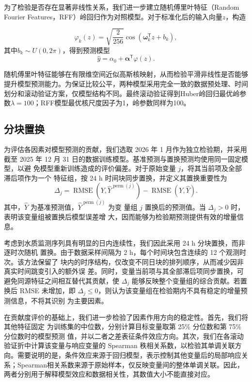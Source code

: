 \documentclass[UTF8,12pt,a4paper]{ctexart}
\begin{document}
为了检验是否存在显著非线性关系，我们进一步建立随机傅里叶特征（Random Fourier Features，RFF）岭回归作为对照模型。对于标准化后的输入向量$z$，构造

\begin{equation}
\varphi_k(z)
=
\sqrt{\frac{2}{256}}
\cos(\boldsymbol\omega_k^{\mathsf T}z+b_k),
\end{equation}
其中$b_k\sim U(0,2\pi)$，得到预测模型
\begin{equation}
\widehat y
=
\alpha_0+
\boldsymbol\alpha^{\mathsf T}
\varphi(z).
\end{equation}

随机傅里叶特征能够在有限维空间近似高斯核映射，从而检验平滑非线性是否能够提升模型预测能力。为保证比较公平，两种模型采用完全一致的数据预处理、时间划分和滚动验证方案，仅模型结构不同。最终滚动验证得到Huber岭回归最优岭参数$\lambda=100$；RFF模型最优核尺度因子为1，岭参数同样为100。

\subsection{分块置换}

为评估各因素对模型预测的贡献，我们选取 2026 年 1 月作为独立检验期，并采用截至
2025 年 12 月 31 日的数据训练模型。基准预测与置换预测均使用同一固定模型，以避
免模型重新训练造成的评价偏差。对于原始变量 \(j\)，将其当前项及全部滞后项作为一个
特征组，按 24 h 时间块同步置换，并定义其置换重要性为
\[
\Delta_j=
\operatorname{RMSE}\left(Y,\widehat{Y}^{\operatorname{perm}(j)}\right)
-\operatorname{RMSE}\left(Y,\widehat{Y}\right).
\label{eq:perm}
\]
其中，\(\widehat{Y}\) 为基准预测值，\(\widehat{Y}^{\operatorname{perm}(j)}\) 为变
量组 \(j\) 置换后的预测值。当 \(\Delta_j>0\) 时，表明该变量组被置换后模型误差增
大，因而能够为检验期预测提供有效的增量信息。

考虑到水质监测序列具有明显的日内连续性，我们因此采用 24 h 分块置换，而非逐时次随机
置换。由于数据采样间隔为 2 h，每个时间块包含连续的 12 个观测时次。该方法保留了
块内的时序结构，仅改变不同日块的排列顺序，从而减少因非真实时间跳变引入的额外误
差。同时，变量当前项与其全部滞后项同步置换，可避免同源特征之间相互替代其贡献，使
\(\Delta_j\) 能够反映整个变量组的综合贡献。若置换后 RMSE 未增加，即
\(\Delta_j\leq 0\)，则认为该变量组在检验期内不具有稳定的增量预测信息，不将其识别
为主要因素。

在贡献度评价的基础上，我们进一步检验了因素作用方向的稳定性。首先，我们将其他特征固定
为训练集的中位数，分别计算目标变量取第 25\% 分位数和第 75\% 分位数时的模型预测
值，并以二者之差表征条件效应方向。其次，我们在各滚动验证折中计算该变量与响应变量的
Spearman 秩相关系数，以检验其单调关联方向。需要说明的是，条件效应来源于回归模型，表示控制其他变量后的局部响应关系；Spearman相关系数来源于原始样本，仅反映变量间的整体单调关联。因此，两者分别用于解释模型效应和数据相关性，其数值大小不能直接对应。
\end{document}
